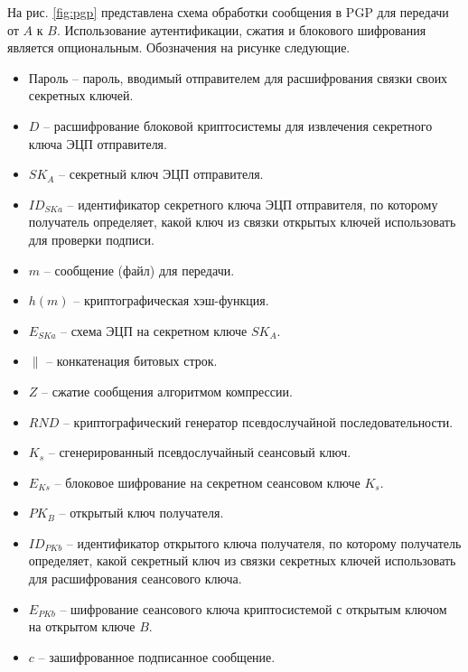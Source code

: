 На рис. \ref{fig:pgp} представлена схема обработки сообщения в PGP для передачи от $A$ к $B$. Использование аутентификации, сжатия и блокового шифрования является опциональным. Обозначения на рисунке следующие.
\begin{itemize}
    \item Пароль -- пароль, вводимый отправителем для расшифрования связки своих секретных ключей.
    \item $D$ -- расшифрование блоковой криптосистемы для извлечения секретного ключа ЭЦП отправителя.
    \item $SK_A$ -- секретный ключ ЭЦП отправителя.
    \item $ID_{SKa}$ -- идентификатор секретного ключа ЭЦП отправителя, по которому получатель определяет, какой ключ из связки открытых ключей использовать для проверки подписи.
    \item $m$ -- сообщение (файл) для передачи.
    \item $h(m)$ -- криптографическая хэш-функция.
    \item $E_{SKa}$ -- схема ЭЦП на секретном ключе $SK_A$.
    \item $\|$ -- конкатенация битовых строк.
    \item $Z$ -- сжатие сообщения алгоритмом компрессии.
    \item $RND$ -- криптографический генератор псевдослучайной последовательности.
    \item $K_s$ -- сгенерированный псевдослучайный сеансовый ключ.
    \item $E_{Ks}$ -- блоковое шифрование на секретном сеансовом ключе $K_s$.
    \item $PK_B$ -- открытый ключ получателя.
    \item $ID_{PKb}$ -- идентификатор открытого ключа получателя, по которому получатель определяет, какой секретный ключ из связки секретных ключей использовать для расшифрования сеансового ключа.
    \item $E_{PKb}$ -- шифрование сеансового ключа криптосистемой с открытым ключом на открытом ключе $B$.
    \item $c$ -- зашифрованное подписанное сообщение.
\end{itemize}
